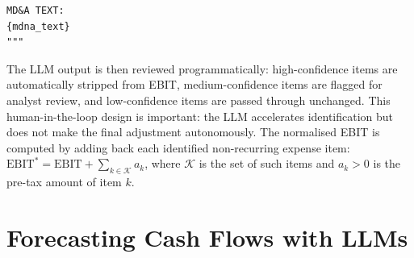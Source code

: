 \begin{deepdive}
\begin{listing}[H]
\begin{verbatim}
MD&A TEXT:
{mdna_text}
"""
\end{verbatim}
\caption{Prompt for Non-Recurring Item Identification}
\label{lst:nonrecurring-prompt}
\end{listing}

The LLM output is then reviewed programmatically: high-confidence items are
automatically stripped from EBIT, medium-confidence items are flagged for analyst
review, and low-confidence items are passed through unchanged. This human-in-the-loop
design is important: the LLM accelerates identification but does not make the final
adjustment autonomously. The normalised EBIT is computed by adding back each identified non-recurring expense item: $\mathrm{EBIT}^* = \mathrm{EBIT} + \sum_{k \in \mathcal{K}} a_k$, where $\mathcal{K}$ is the set of such items and $a_k > 0$ is the pre-tax amount of item $k$.
\end{deepdive}


\section{Forecasting Cash Flows with LLMs}
\label{sec:bv-forecasting}

